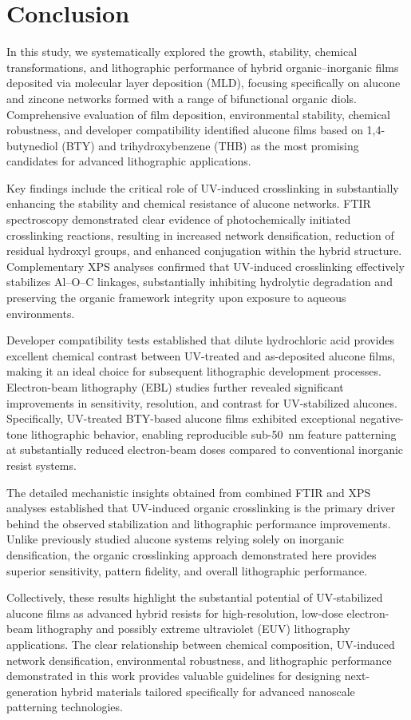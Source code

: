 \section{Conclusion}

In this study, we systematically explored the growth, stability, chemical transformations, and lithographic performance of hybrid organic–inorganic films deposited via molecular layer deposition (MLD), focusing specifically on alucone and zincone networks formed with a range of bifunctional organic diols. Comprehensive evaluation of film deposition, environmental stability, chemical robustness, and developer compatibility identified alucone films based on 1,4-butynediol (BTY) and trihydroxybenzene (THB) as the most promising candidates for advanced lithographic applications.

Key findings include the critical role of UV-induced crosslinking in substantially enhancing the stability and chemical resistance of alucone networks. FTIR spectroscopy demonstrated clear evidence of photochemically initiated crosslinking reactions, resulting in increased network densification, reduction of residual hydroxyl groups, and enhanced conjugation within the hybrid structure. Complementary XPS analyses confirmed that UV-induced crosslinking effectively stabilizes Al–O–C linkages, substantially inhibiting hydrolytic degradation and preserving the organic framework integrity upon exposure to aqueous environments.

Developer compatibility tests established that dilute hydrochloric acid provides excellent chemical contrast between UV-treated and as-deposited alucone films, making it an ideal choice for subsequent lithographic development processes. Electron-beam lithography (EBL) studies further revealed significant improvements in sensitivity, resolution, and contrast for UV-stabilized alucones. Specifically, UV-treated BTY-based alucone films exhibited exceptional negative-tone lithographic behavior, enabling reproducible sub-50~nm feature patterning at substantially reduced electron-beam doses compared to conventional inorganic resist systems.

The detailed mechanistic insights obtained from combined FTIR and XPS analyses established that UV-induced organic crosslinking is the primary driver behind the observed stabilization and lithographic performance improvements. Unlike previously studied alucone systems relying solely on inorganic densification, the organic crosslinking approach demonstrated here provides superior sensitivity, pattern fidelity, and overall lithographic performance.

Collectively, these results highlight the substantial potential of UV-stabilized alucone films as advanced hybrid resists for high-resolution, low-dose electron-beam lithography and possibly extreme ultraviolet (EUV) lithography applications. The clear relationship between chemical composition, UV-induced network densification, environmental robustness, and lithographic performance demonstrated in this work provides valuable guidelines for designing next-generation hybrid materials tailored specifically for advanced nanoscale patterning technologies.
